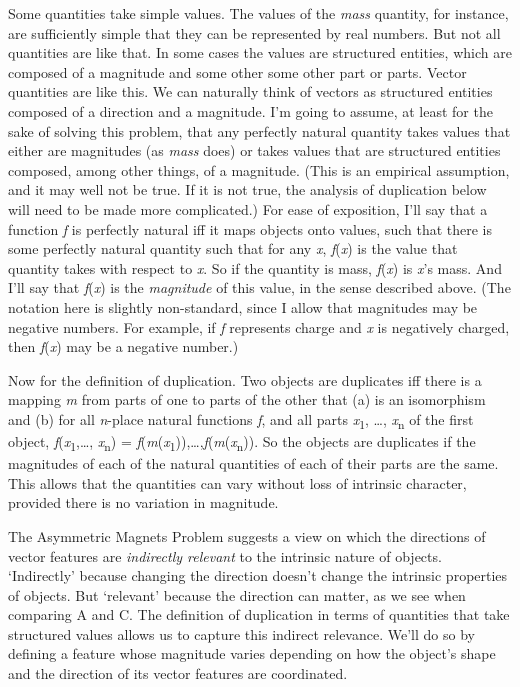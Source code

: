 \documentclass[
  11pt,
  letterpaper,
  DIV=11,
  numbers=noendperiod,
  twoside]{scrartcl}
\begin{document}
Some quantities take simple values. The values of the \emph{mass}
quantity, for instance, are sufficiently simple that they can be
represented by real numbers. But not all quantities are like that. In
some cases the values are structured entities, which are composed of a
magnitude and some other some other part or parts. Vector quantities are
like this. We can naturally think of vectors as structured entities
composed of a direction and a magnitude. I'm going to assume, at least
for the sake of solving this problem, that any perfectly natural
quantity takes values that either are magnitudes (as \emph{mass} does)
or takes values that are structured entities composed, among other
things, of a magnitude. (This is an empirical assumption, and it may
well not be true. If it is not true, the analysis of duplication below
will need to be made more complicated.) For ease of exposition, I'll say
that a function \emph{f} is perfectly natural iff it maps objects onto
values, such that there is some perfectly natural quantity such that for
any \emph{x}, \emph{f}(\emph{x}) is the value that quantity takes with
respect to \emph{x}. So if the quantity is mass, \emph{f}(\emph{x}) is
\emph{x}'s mass. And I'll say that
\textbar{}\emph{f}(\emph{x})\textbar{} is the \emph{magnitude} of this
value, in the sense described above. (The notation here is slightly
non-standard, since I allow that magnitudes may be negative numbers. For
example, if \emph{f} represents charge and \emph{x} is negatively
charged, then \textbar{}\emph{f}(\emph{x})\textbar{} may be a negative
number.)

Now for the definition of duplication. Two objects are duplicates iff
there is a mapping \emph{m} from parts of one to parts of the other that
(a) is an isomorphism and (b) for all \emph{n}-place natural functions
\emph{f}, and all parts \emph{x}\textsubscript{1}, \ldots,
\emph{x}\textsubscript{n} of the first object,
\textbar{}\emph{f}(\emph{x}\textsubscript{1},\ldots,
\emph{x}\textsubscript{n})\textbar{} =
\textbar{}\emph{f}(\emph{m}(\emph{x}\textsubscript{1})),\ldots,\emph{f}(\emph{m}(\emph{x}\textsubscript{n}))\textbar.
So the objects are duplicates if the magnitudes of each of the natural
quantities of each of their parts are the same. This allows that the
quantities can vary without loss of intrinsic character, provided there
is no variation in magnitude.

The Asymmetric Magnets Problem suggests a view on which the directions
of vector features are \emph{indirectly relevant} to the intrinsic
nature of objects. `Indirectly' because changing the direction doesn't
change the intrinsic properties of objects. But `relevant' because the
direction can matter, as we see when comparing A and C. The definition
of duplication in terms of quantities that take structured values allows
us to capture this indirect relevance. We'll do so by defining a feature
whose magnitude varies depending on how the object's shape and the
direction of its vector features are coordinated.
\end{document}
